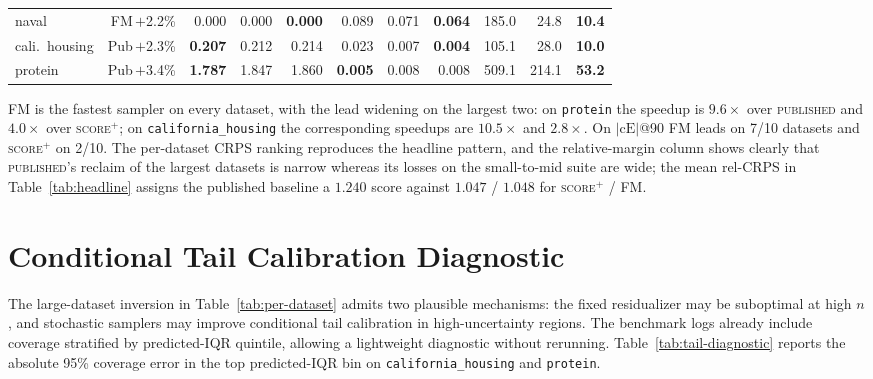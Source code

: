 \documentclass{uai2026}
\begin{document}
\begin{table}[!h]
\begin{tabular}{lrrrrrrrrrr}
    naval              & FM\,$+$2.2\%      & 0.000 & 0.000 & \textbf{0.000} & 0.089 & 0.071 & \textbf{0.064} & 185.0 & 24.8 & \textbf{10.4} \\
    cali.\ housing     & Pub\,$+$2.3\%     & \textbf{0.207} & 0.212 & 0.214 & 0.023 & 0.007 & \textbf{0.004} & 105.1 & 28.0 & \textbf{10.0} \\
    protein            & Pub\,$+$3.4\%     & \textbf{1.787} & 1.847 & 1.860 & \textbf{0.005} & 0.008 & 0.008 & 509.1 & 214.1 & \textbf{53.2} \\
    \bottomrule
  \end{tabular}
\end{table}

FM is the fastest sampler on every dataset, with the lead widening on the largest two: on \texttt{protein} the speedup is $9.6\times$ over \textsc{published} and $4.0\times$ over \textsc{score$^+$}; on \texttt{california\_housing} the corresponding speedups are $10.5\times$ and $2.8\times$. On $|\text{cE}|$@90 FM leads on 7/10 datasets and \textsc{score$^+$} on 2/10. The per-dataset CRPS ranking reproduces the headline pattern, and the relative-margin column shows clearly that \textsc{published}'s reclaim of the largest datasets is narrow whereas its losses on the small-to-mid suite are wide; the mean rel-CRPS in Table~\ref{tab:headline} assigns the published baseline a $1.240$ score against $1.047$ / $1.048$ for \textsc{score$^+$} / \textsc{FM}.

\section{Conditional Tail Calibration Diagnostic}\label{app:tail-diagnostic}

The large-dataset inversion in Table~\ref{tab:per-dataset} admits two plausible mechanisms: the fixed residualizer may be suboptimal at high $n$, and stochastic samplers may improve conditional tail calibration in high-uncertainty regions. The benchmark logs already include coverage stratified by predicted-IQR quintile, allowing a lightweight diagnostic without rerunning. Table~\ref{tab:tail-diagnostic} reports the absolute 95\% coverage error in the top predicted-IQR bin on \texttt{california\_housing} and \texttt{protein}.
\end{document}
